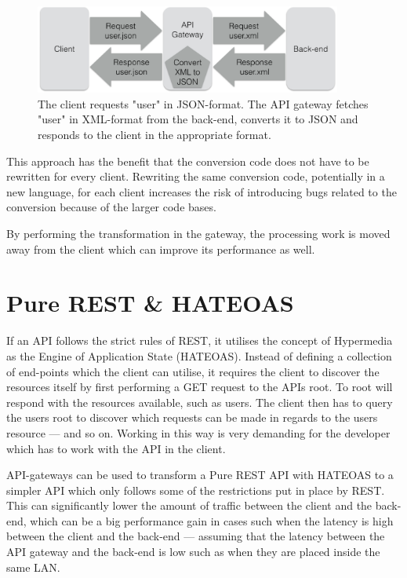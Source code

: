 \documentclass{cslthse-msc}
\begin{document}
\begin{figure}[H]
  \centering
    \begin{center}
      \includegraphics[width=0.9\textwidth]{images/api_gateway_transform.png}
    \end{center}
  \caption{The client requests "user" in JSON-format. The API gateway fetches "user" in XML-format from the back-end, converts it to JSON and responds to the client in the appropriate format.}
\end{figure}

This approach has the benefit that the conversion code does not have to be rewritten for every client. Rewriting the same conversion code, potentially in a new language, for each client increases the risk of introducing bugs related to the conversion because of the larger code bases\cite{code_complete}. 

By performing the transformation in the gateway, the processing work is moved away from the client which can improve its performance as well.

\section{Pure REST \& HATEOAS}
If an API follows the strict rules of REST, it utilises the concept of Hypermedia as the Engine of Application State (HATEOAS). Instead of defining a collection of end-points which the client can utilise, it requires the client to discover the resources itself by first performing a GET request to the APIs root. To root will respond with the resources available, such as users. The client then has to query the users root to discover which requests can be made in regards to the users resource --- and so on. Working in this way is very demanding for the developer which has to work with the API in the client\cite[page 61]{AASG}.

API-gateways can be used to transform a Pure REST API with HATEOAS to a simpler API which only follows some of the restrictions put in place by REST. This can significantly lower the amount of traffic between the client and the back-end, which can be a big performance gain in cases such when the latency is high between the client and the back-end --- assuming that the latency between the API gateway and the back-end is low such as when they are placed inside the same LAN.
\end{document}
